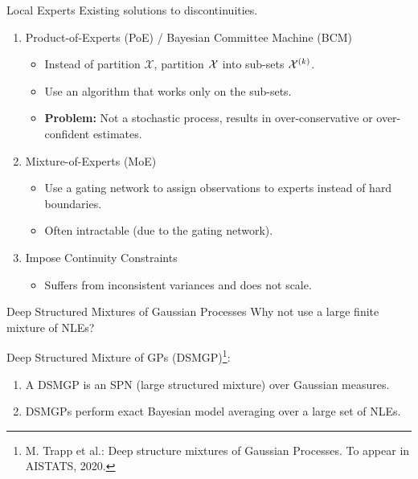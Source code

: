 \begin{frame}{Local Experts}
Existing solutions to discontinuities.
\begin{enumerate}
    \item Product-of-Experts (PoE) / Bayesian Committee Machine (BCM)
  \begin{itemize}
      \item Instead of partition $\mathcal{X}$, partition $\mathcal{X}$ into sub-sets $\mathcal{X}^{(k)}$.
    \item Use an algorithm that works only on the sub-sets.
    \item \textbf{Problem:} Not a stochastic process, results in over-conservative or over-confident estimates.
  \end{itemize}
  \item Mixture-of-Experts (MoE)
  \begin{itemize}
    \item Use a gating network to assign observations to experts instead of hard boundaries.
    \item Often intractable (due to the gating network).
  \end{itemize}
  \item Impose Continuity Constraints
  \begin{itemize}
    \item Suffers from inconsistent variances and does not scale.
  \end{itemize}
\end{enumerate}
\end{frame}

\begin{frame}{Deep Structured Mixtures of Gaussian Processes}
Why not use a large finite mixture of NLEs?
\pause

Deep Structured Mixture of GPs (DSMGP)\footnote{\scriptsize M. Trapp et al.: Deep structure mixtures of Gaussian Processes. To appear in AISTATS, 2020.}:
\begin{enumerate}
  \item A DSMGP is an SPN (large structured mixture) over Gaussian measures.
  \item DSMGPs perform exact Bayesian model averaging over a large set of NLEs.
\end{enumerate}
\end{frame}

